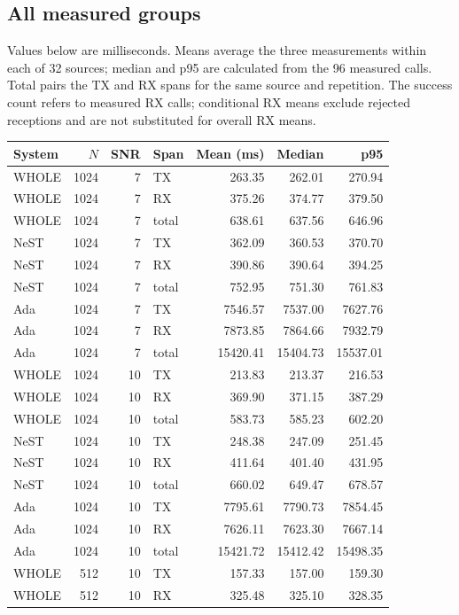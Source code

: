 \documentclass[10pt,letterpaper]{article}
\begin{document}
\subsection{All measured groups}
Values below are milliseconds. Means average the three measurements within each of 32 sources; median and p95 are calculated from the 96 measured calls. Total pairs the TX and RX spans for the same source and repetition. The success count refers to measured RX calls; conditional RX means exclude rejected receptions and are not substituted for overall RX means.
\begin{longtable}{@{}lrrlrrr@{}}\toprule
System & $N$ & SNR & Span & Mean (ms) & Median & p95\\\midrule\endhead
WHOLE & 1024 & 7 & TX & 263.35 & 262.01 & 270.94\\
WHOLE & 1024 & 7 & RX & 375.26 & 374.77 & 379.50\\
WHOLE & 1024 & 7 & total & 638.61 & 637.56 & 646.96\\
NeST & 1024 & 7 & TX & 362.09 & 360.53 & 370.70\\
NeST & 1024 & 7 & RX & 390.86 & 390.64 & 394.25\\
NeST & 1024 & 7 & total & 752.95 & 751.30 & 761.83\\
Ada & 1024 & 7 & TX & 7546.57 & 7537.00 & 7627.76\\
Ada & 1024 & 7 & RX & 7873.85 & 7864.66 & 7932.79\\
Ada & 1024 & 7 & total & 15420.41 & 15404.73 & 15537.01\\
WHOLE & 1024 & 10 & TX & 213.83 & 213.37 & 216.53\\
WHOLE & 1024 & 10 & RX & 369.90 & 371.15 & 387.29\\
WHOLE & 1024 & 10 & total & 583.73 & 585.23 & 602.20\\
NeST & 1024 & 10 & TX & 248.38 & 247.09 & 251.45\\
NeST & 1024 & 10 & RX & 411.64 & 401.40 & 431.95\\
NeST & 1024 & 10 & total & 660.02 & 649.47 & 678.57\\
Ada & 1024 & 10 & TX & 7795.61 & 7790.73 & 7854.45\\
Ada & 1024 & 10 & RX & 7626.11 & 7623.30 & 7667.14\\
Ada & 1024 & 10 & total & 15421.72 & 15412.42 & 15498.35\\
WHOLE & 512 & 10 & TX & 157.33 & 157.00 & 159.30\\
WHOLE & 512 & 10 & RX & 325.48 & 325.10 & 328.35\\

\end{longtable}
\end{document}
